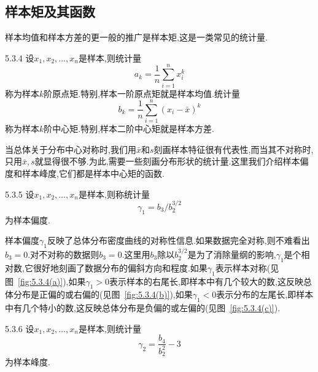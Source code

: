 \subsection{样本矩及其函数\label{ssec:5.3.4}}
样本均值和样本方差的更一般的推广是样本矩,这是一类常见的统计量.
\begin{definition}{}{5.3.4}
设$x_1,x_2,\dotsc,x_n$是样本,则统计量
\begin{equation}\label{eq:5.3.9}
a_k=\frac1n\sum_{i=1}^nx_i^k
\end{equation}
称为样本$k$阶原点矩.特别,样本一阶原点矩就是样本均值.统计量
\begin{equation}\label{eq:5.3.10}
b_k=\frac1n\sum_{i=1}^n(x_i-\bar x)^k
\end{equation}
称为样本$k$阶中心矩.特别,样本二阶中心矩就是样本方差.
\end{definition}

当总体关于分布中心对称时,我们用$\bar x$和$s$刻画样本特征很有代表性,而当其不对称时,只用$\bar x,s$就显得很不够.为此,需要一些刻画分布形状的统计量.这里我们介绍样本偏度和样本峰度,它们都是样本中心矩的函数.
\begin{definition}{}{5.3.5}
设$x_1,x_2,\dotsc,x_n$是样本,则称统计量
\begin{equation}\label{eq:5.3.11}
\gamma_1=b_3/b_2^{3/2}
\end{equation}
为样本偏度.
\end{definition}
样本偏度$\gamma_1$反映了总体分布密度曲线的对称性信息.如果数据完全对称,则不难看出$b_3=0$.对不对称的数据则$b_3=0$.这里用$b_3$除以$b_2^{3/2}$是为了消除量纲的影响,$\gamma_1$是个相对数,它很好地刻画了数据分布的偏斜方向和程度.如果$\gamma_1$表示样本对称(见图~\ref{fig:5.3.4(a)}),如果$\gamma_1>0$表示样本的右尾长,即样本中有几个较大的数,这反映总体分布是正偏的或右偏的(见图~\ref{fig:5.3.4(b)}),如果$\gamma_1<0$表示分布的左尾长,即样本中有几个特小的数,这反映总体分布是负偏的或左偏的(见图~\ref{fig:5.3.4(c)}).
\begin{definition}{}{5.3.6}
设$x_1,x_2,\dotsc,x_n$是样本,则统计量
\begin{equation}\label{eq:5.3.12}
\gamma_2=\frac{b_4}{b_2^2}-3
\end{equation}
为样本峰度.
\end{definition}

